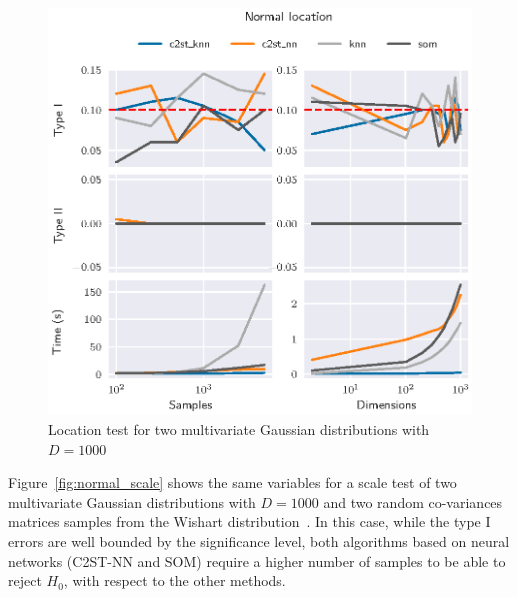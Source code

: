 \begin{figure}[htpb]
    \centering
    \includegraphics{images/4_som/normal_location}
    \caption{
    Location test for two multivariate Gaussian distributions with $D=1000$}
    \label{fig:normal_location}
\end{figure}

Figure~\ref{fig:normal_scale} shows the same variables for a scale test of two multivariate
Gaussian distributions with $D=1000$ and two random co-variances matrices samples from the
Wishart distribution~\cite{smith1972algorithm}. In this case, while the type I errors are
well bounded by the significance level, both algorithms based on neural networks
(C2ST-NN and SOM) require a higher number of samples to be able to reject $H_0$, with respect
to the other methods.

